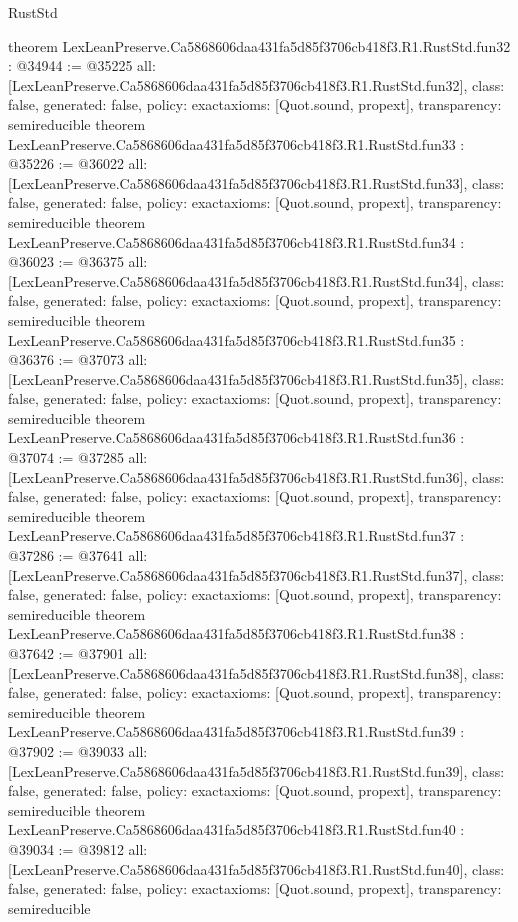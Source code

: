 \begin{lexlean}{RustStd}
\begin{coremodule}
{}
theorem LexLeanPreserve.Ca5868606daa431fa5d85f3706cb418f3.R1.RustStd.fun32 : @34944 := @35225 {
  all: [LexLeanPreserve.Ca5868606daa431fa5d85f3706cb418f3.R1.RustStd.fun32],
  class: false,
  generated: false,
  policy: exact{axioms: [Quot.sound, propext]},
  transparency: semireducible
}
theorem LexLeanPreserve.Ca5868606daa431fa5d85f3706cb418f3.R1.RustStd.fun33 : @35226 := @36022 {
  all: [LexLeanPreserve.Ca5868606daa431fa5d85f3706cb418f3.R1.RustStd.fun33],
  class: false,
  generated: false,
  policy: exact{axioms: [Quot.sound, propext]},
  transparency: semireducible
}
theorem LexLeanPreserve.Ca5868606daa431fa5d85f3706cb418f3.R1.RustStd.fun34 : @36023 := @36375 {
  all: [LexLeanPreserve.Ca5868606daa431fa5d85f3706cb418f3.R1.RustStd.fun34],
  class: false,
  generated: false,
  policy: exact{axioms: [Quot.sound, propext]},
  transparency: semireducible
}
theorem LexLeanPreserve.Ca5868606daa431fa5d85f3706cb418f3.R1.RustStd.fun35 : @36376 := @37073 {
  all: [LexLeanPreserve.Ca5868606daa431fa5d85f3706cb418f3.R1.RustStd.fun35],
  class: false,
  generated: false,
  policy: exact{axioms: [Quot.sound, propext]},
  transparency: semireducible
}
theorem LexLeanPreserve.Ca5868606daa431fa5d85f3706cb418f3.R1.RustStd.fun36 : @37074 := @37285 {
  all: [LexLeanPreserve.Ca5868606daa431fa5d85f3706cb418f3.R1.RustStd.fun36],
  class: false,
  generated: false,
  policy: exact{axioms: [Quot.sound, propext]},
  transparency: semireducible
}
theorem LexLeanPreserve.Ca5868606daa431fa5d85f3706cb418f3.R1.RustStd.fun37 : @37286 := @37641 {
  all: [LexLeanPreserve.Ca5868606daa431fa5d85f3706cb418f3.R1.RustStd.fun37],
  class: false,
  generated: false,
  policy: exact{axioms: [Quot.sound, propext]},
  transparency: semireducible
}
theorem LexLeanPreserve.Ca5868606daa431fa5d85f3706cb418f3.R1.RustStd.fun38 : @37642 := @37901 {
  all: [LexLeanPreserve.Ca5868606daa431fa5d85f3706cb418f3.R1.RustStd.fun38],
  class: false,
  generated: false,
  policy: exact{axioms: [Quot.sound, propext]},
  transparency: semireducible
}
theorem LexLeanPreserve.Ca5868606daa431fa5d85f3706cb418f3.R1.RustStd.fun39 : @37902 := @39033 {
  all: [LexLeanPreserve.Ca5868606daa431fa5d85f3706cb418f3.R1.RustStd.fun39],
  class: false,
  generated: false,
  policy: exact{axioms: [Quot.sound, propext]},
  transparency: semireducible
}
theorem LexLeanPreserve.Ca5868606daa431fa5d85f3706cb418f3.R1.RustStd.fun40 : @39034 := @39812 {
  all: [LexLeanPreserve.Ca5868606daa431fa5d85f3706cb418f3.R1.RustStd.fun40],
  class: false,
  generated: false,
  policy: exact{axioms: [Quot.sound, propext]},
  transparency: semireducible
}
\end{coremodule}
\end{lexlean}
